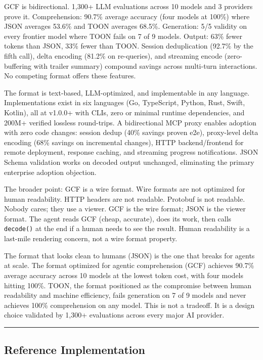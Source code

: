 \documentclass[
  11pt,
  paper=a4,
  ,captions=tableheading
]{scrartcl}
\begin{document}
GCF is bidirectional. 1,300+ LLM evaluations across 10 models and 3
providers prove it. Comprehension: 90.7\% average accuracy (four models
at 100\%) where JSON averages 53.6\% and TOON averages 68.5\%.
Generation: 5/5 validity on every frontier model where TOON fails on 7
of 9 models. Output: 63\% fewer tokens than JSON, 33\% fewer than TOON.
Session deduplication (92.7\% by the fifth call), delta encoding (81.2\%
on re-queries), and streaming encode (zero-buffering with trailer
summary) compound savings across multi-turn interactions. No competing
format offers these features.

The format is text-based, LLM-optimized, and implementable in any
language. Implementations exist in six languages (Go, TypeScript,
Python, Rust, Swift, Kotlin), all at v1.0.0+ with CLIs, zero or minimal
runtime dependencies, and 200M+ verified lossless round-trips. A
bidirectional MCP proxy enables adoption with zero code changes: session
dedup (40\% savings proven e2e), proxy-level delta encoding (68\%
savings on incremental changes), HTTP backend/frontend for remote
deployment, response caching, and streaming progress notifications. JSON
Schema validation works on decoded output unchanged, eliminating the
primary enterprise adoption objection.

The broader point: GCF is a wire format. Wire formats are not optimized
for human readability. HTTP headers are not readable. Protobuf is not
readable. Nobody cares; they use a viewer. GCF is the wire format; JSON
is the viewer format. The agent reads GCF (cheap, accurate), does its
work, then calls \texttt{decode()} at the end if a human needs to see
the result. Human readability is a last-mile rendering concern, not a
wire format property.

The format that looks clean to humans (JSON) is the one that breaks for
agents at scale. The format optimized for agentic comprehension (GCF)
achieves 90.7\% average accuracy across 10 models at the lowest token
cost, with four models hitting 100\%. TOON, the format positioned as the
compromise between human readability and machine efficiency, fails
generation on 7 of 9 models and never achieves 100\% comprehension on
any model. This is not a tradeoff. It is a design choice validated by
1,300+ evaluations across every major AI provider.

\begin{center}\rule{0.5\linewidth}{0.5pt}\end{center}

\subsection{Reference Implementation}\label{reference-implementation}
\end{document}
